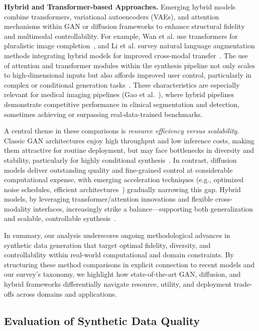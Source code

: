 \documentclass[sigconf]{acmart}
\begin{document}
\textbf{Hybrid and Transformer-based Approaches.} Emerging hybrid models combine transformers, variational autoencoders (VAEs), and attention mechanisms within GAN or diffusion frameworks to enhance structural fidelity and multimodal controllability. For example, Wan et al. use transformers for pluralistic image completion~\cite{ref92}, and Li et al. survey natural language augmentation methods integrating hybrid models for improved cross-modal transfer~\cite{ref65}. The use of attention and transformer modules within the synthesis pipeline not only scales to high-dimensional inputs but also affords improved user control, particularly in complex or conditional generation tasks~\cite{ref64,ref81,ref101}. These characteristics are especially relevant for medical imaging pipelines (Gao et al.~\cite{ref81}), where hybrid pipelines demonstrate competitive performance in clinical segmentation and detection, sometimes achieving or surpassing real-data-trained benchmarks.

A central theme in these comparisons is \textit{resource efficiency versus scalability}. Classic GAN architectures enjoy high throughput and low inference costs, making them attractive for routine deployment, but may face bottlenecks in diversity and stability, particularly for highly conditional synthesis~\cite{ref61,ref92,ref102}. In contrast, diffusion models deliver outstanding quality and fine-grained control at considerable computational expense, with emerging acceleration techniques (e.g., optimized noise schedules, efficient architectures~\cite{ref64,ref93}) gradually narrowing this gap. Hybrid models, by leveraging transformer/attention innovations and flexible cross-modality interfaces, increasingly strike a balance—supporting both generalization and scalable, controllable synthesis~\cite{ref65,ref81,ref101}.

In summary, our analysis underscores ongoing methodological advances in synthetic data generation that target optimal fidelity, diversity, and controllability within real-world computational and domain constraints. By structuring these method comparisons in explicit connection to recent models and our survey's taxonomy, we highlight how state-of-the-art GAN, diffusion, and hybrid frameworks differentially navigate resource, utility, and deployment trade-offs across domains and applications.

\subsection{Evaluation of Synthetic Data Quality}
\end{document}
